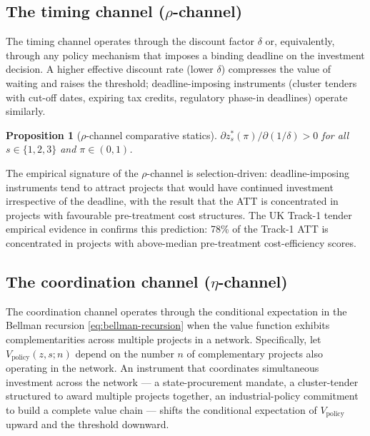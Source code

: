 \documentclass[12pt,a4paper]{article}
\theoremstyle{plain}
\newtheorem{proposition}{Proposition}
\theoremstyle{definition}
\begin{document}
\subsection{The timing channel ($\rho$-channel)}
\label{sec:channel-rho}

The timing channel operates through the discount factor $\delta$ or, equivalently, through any policy mechanism that imposes a binding deadline on the investment decision. A higher effective discount rate (lower $\delta$) compresses the value of waiting and raises the threshold; deadline-imposing instruments (cluster tenders with cut-off dates, expiring tax credits, regulatory phase-in deadlines) operate similarly.

\begin{proposition}[$\rho$-channel comparative statics]
\label{prop:rho-channel}
$\partial z^{*}_{s}(\pi) / \partial (1/\delta) > 0$ for all $s \in \{1, 2, 3\}$ and $\pi \in (0, 1)$.
\end{proposition}
\noindent The empirical signature of the $\rho$-channel is selection-driven: deadline-imposing instruments tend to attract projects that would have continued investment irrespective of the deadline, with the result that the ATT is concentrated in projects with favourable pre-treatment cost structures. The UK Track-1 tender empirical evidence in \cite{saakstra2026paper2} confirms this prediction: 78\% of the Track-1 ATT is concentrated in projects with above-median pre-treatment cost-efficiency scores.

\subsection{The coordination channel ($\eta$-channel)}
\label{sec:channel-eta}

The coordination channel operates through the conditional expectation in the Bellman recursion \eqref{eq:bellman-recursion} when the value function exhibits complementarities across multiple projects in a network. Specifically, let $V_{\text{policy}}(z, s; n)$ depend on the number $n$ of complementary projects also operating in the network. An instrument that coordinates simultaneous investment across the network --- a state-procurement mandate, a cluster-tender structured to award multiple projects together, an industrial-policy commitment to build a complete value chain --- shifts the conditional expectation of $V_{\text{policy}}$ upward and the threshold downward.
\end{document}
